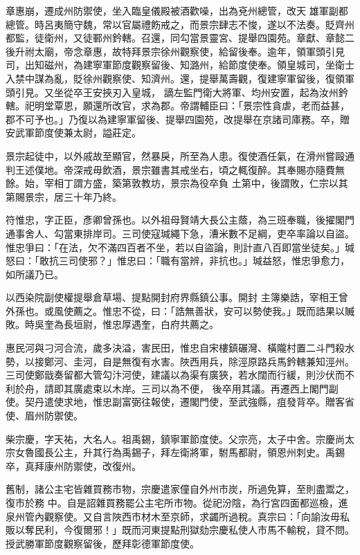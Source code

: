 \begin{pinyinscope}
 章惠崩，遷成州防禦使，坐入臨皇儀殿被酒歡噪，出為兗州總管，改天
 雄軍副都總管。時呂夷簡守魏，常以官屬禮飭戒之，而景宗肆志不悛，遂以不法奏。貶齊州都監，徒衛州，又徒鄆州鈐轄。召還，同勾當景靈宮、提舉四園苑。章獻、章懿二後升祔太廟，帝念章惠，故特拜景宗徐州觀察使，給留後奉。逾年，領軍頭引見司，出知磁州，為建寧軍節度觀察留後、知潞州，給節度使奉。領皇城司，坐衛士入禁中謀為亂，貶徐州觀察使、知濟州。還，提舉萬壽觀，復建寧軍留後，復領軍頭引見。又坐從卒王安挾刃入皇城，
 謫左監門衛大將軍、均州安置，起為汝州鈐轄。祀明堂覃恩，願還所改官，求為郡。帝謂輔臣曰：「景宗性貪虐，老而益甚，郡不可予也。」乃復以為建寧軍留後、提舉四園苑，改提舉在京諸司庫務。卒，贈安武軍節度使兼太尉，謚莊定。



 景宗起徒中，以外戚故至顯官，然暴戾，所至為人患。復使酒任氣，在滑州嘗毆通判王述僕地。帝深戒毋飲酒，景宗雖書其戒坐右，頃之輒復醉。其奉賜亦隨費無餘。始，宰相丁謂方盛，築第敦教坊，景宗為役卒負
 土第中，後謂敗，仁宗以其第賜景宗，居三十年乃終。



 符惟忠，字正臣，彥卿曾孫也。以外祖母賢靖大長公主蔭，為三班奉職，後擢閣門通事舍人、勾當東排岸司。三司使寇瑊繩下急，漕米數不足綱，吏卒率論以自盜。惟忠爭曰：「在法，欠不滿四百者不坐，若以自盜論，則計直八百即當坐徒矣。」瑊怒曰：「敢抗三司使邪？」惟忠曰：「職有當辨，非抗也。」瑊益怒，惟忠爭愈力，如所議乃已。



 以西染院副使權提舉倉草場、提點開封府界縣鎮公事。開封
 主簿樂誥，宰相王曾外孫也。或風使薦之。惟忠不從，曰：「誥無善狀，安可以勢使我。」既而誥果以贓敗。時吳奎為長垣尉，惟忠厚遇奎，白府共薦之。



 惠民河與刁河合流，歲多決溢，害民田，惟忠自宋樓鎮碾灣、橫隴村置二斗門殺水勢，以接鄭河、圭河，自是無復有水害。陜西用兵，除涇原路兵馬鈐轄兼知涇州。三司使鄭戩奏留都大管勾汴河使，建議以為渠有廣狹，若水闊而行緩，則沙伏而不利於舟，請即其廣處束以木岸。三司以為不便，
 後卒用其議。再遷西上閣門副使。契丹遣使求地，惟忠副富弼往報使，遷閣門使，至武強縣，疽發背卒。贈客省使、眉州防禦使。



 柴宗慶，字天祐，大名人。祖禹錫，鎮寧軍節度使。父宗亮，太子中舍。宗慶尚太宗女魯國長公主，升其行為禹錫子，拜左衛將軍，駙馬都尉，領恩州刺史。禹錫卒，真拜康州防禦使，改復州。



 舊制，諸公主宅皆雜買務市物，宗慶遣家僮自外州市炭，所過免算，至則盡鬻之，復市於務
 中。自是詔雜買務罷公主宅所市物。從祀汾陰，為行宮四面都巡檢，進泉州管內觀察使。又自言陜西市材木至京師，求蠲所過稅。真宗曰：「向諭汝毋私販以奪民利，今復爾邪！」既而河東提點刑獄劾宗慶私使人市馬不輸稅，貸不問。授武勝軍節度觀察留後，歷拜彰德軍節度使。




\end{pinyinscope}
